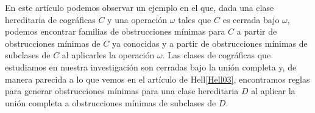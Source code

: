 En este artículo podemos observar un ejemplo en el que, dada una clase hereditaria de cográficas $C$ y una operación $\omega$ tales que $C$ es cerrada bajo $\omega$, podemos encontrar familias de obstrucciones mínimas para $C$ a partir de obstrucciones mínimas de $C$ ya conocidas y a partir de obstrucciones mínimas de subclases de $C$ al aplicarles la operación $\omega$. Las clases de cográficas que estudiamos en nuestra investigación son cerradas bajo la unión completa y, de manera parecida a lo que vemos en el artículo de Hell\ref{Hell03}, encontramos reglas para generar obstrucciones mínimas para una clase hereditaria $D$ al aplicar la unión completa a obstrucciones mínimas de subclases de $D$. 